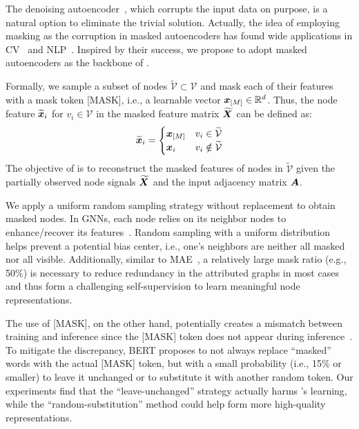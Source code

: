 The denoising autoencoder~\cite{vincent2008extracting}, which corrupts the input data on purpose, is a natural option to eliminate the trivial solution. 
Actually, the idea of employing masking as the corruption in masked autoencoders has found wide applications in CV~\cite{he2021masked,Bao2021BEiTBP} and NLP~\cite{devlin2019bert}.  
Inspired by their success, we propose to adopt masked autoencoders as the backbone of \model.

Formally, we sample a subset of nodes $\widetilde{\mathcal{V}}\subset\mathcal{V}$ and mask each of their features with a mask token [MASK], i.e., a learnable vector ${\bm{x}}_{[M]}\in \mathbb{R}^{d}$.
Thus, the node feature $\widetilde{{\bm{x}}}_{i}$ for $v_i\in\mathcal{V}$ in the masked feature matrix $\widetilde{{\bm{X}}}$ can be defined as:
$$
\widetilde{{\bm{x}}}_{i}=
\begin{cases}
{\bm{x}}_{[M]} & v_i\in\widetilde{\mathcal{V}} \\
{\bm{x}}_i & v_i\notin\widetilde{\mathcal{V}} 
\end{cases}
$$
The objective of \model is to reconstruct the masked features of nodes in $\widetilde{\mathcal{V}}$ given the partially observed node signals $\widetilde{{\bm{X}}}$ and the input adjacency matrix ${\bm{A}}$.

We apply a uniform random sampling strategy without replacement to obtain masked nodes. 
In GNNs, each node relies on its neighbor nodes to enhance/recover its features~\cite{gilmer2017neural}. 
Random sampling with a uniform distribution helps prevent a potential bias center, i.e., one's neighbors are neither all masked nor all visible. 
Additionally, 
similar to MAE~\cite{he2021masked}, 
a relatively large mask ratio (e.g., 50\%) is necessary to reduce redundancy in the attributed graphs in most cases
and thus form a challenging self-supervision to learn meaningful node representations. 

The use of [MASK], on the other hand, potentially creates a mismatch between training and inference since the [MASK] token does not appear during inference~\cite{yang2019xlnet}. 
To mitigate the discrepancy, 
BERT proposes to not always replace ``masked'' words with the actual [MASK] token, but with a small probability (i.e., 15\% or smaller) to leave it unchanged or to substitute it with another random token. 
Our experiments find that the ``leave-unchanged'' strategy actually harms \model's learning, while the ``random-substitution'' method could 
help form more high-quality representations. 














